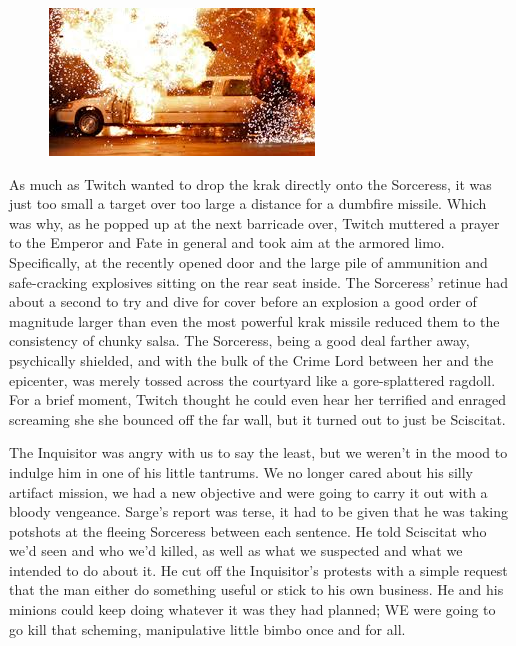 \begin{figure}
	\begin{center}
		\includegraphics[width=\figwidth]{pics/18/54.png}
	\end{center}
\end{figure}
As much as Twitch wanted to drop the krak directly onto the Sorceress, it was just too small a target over too large a distance for a dumbfire missile. 
Which was why, as he popped up at the next barricade over, Twitch muttered a prayer to the Emperor and Fate in general and took aim at the armored limo. 
Specifically, at the recently opened door and the large pile of ammunition and safe-cracking explosives sitting on the rear seat inside. 
The Sorceress' retinue had about a second to try and dive for cover before an explosion a good order of magnitude larger than even the most powerful krak missile reduced them to the consistency of chunky salsa. 
The Sorceress, being a good deal farther away, psychically shielded, and with the bulk of the Crime Lord between her and the epicenter, was merely tossed across the courtyard like a gore-splattered ragdoll. 
For a brief moment, Twitch thought he could even hear her terrified and enraged screaming she she bounced off the far wall, but it turned out to just be Sciscitat.

The Inquisitor was angry with us to say the least, but we weren't in the mood to indulge him in one of his little tantrums. 
We no longer cared about his silly artifact mission, we had a new objective and were going to carry it out with a bloody vengeance. 
Sarge's report was terse, it had to be given that he was taking potshots at the fleeing Sorceress between each sentence. 
He told Sciscitat who we'd seen and who we'd killed, as well as what we suspected and what we intended to do about it. 
He cut off the Inquisitor's protests with a simple request that the man either do something useful or stick to his own business. 
He and his minions could keep doing whatever it was they had planned; 
WE were going to go kill that scheming, manipulative little bimbo once and for all.

